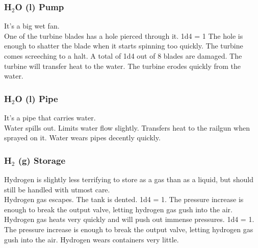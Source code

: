 \documentclass[a4paper]{article}
\begin{document}
\vspace{-0.5cm} \hspace{-18pt} \subsubsection{H$_2$O (l) Pump} \label{life_h2o_pump} \vspace{-0.2cm}
It's a big wet fan.
\\ \pbhw
{One of the turbine blades has a hole pierced through it. \newline 1d4 = 1 The hole is enough to shatter the blade when it starts spinning too quickly. }
{The turbine comes screeching to a halt. A total of 1d4 out of 8 blades are damaged.}
{The turbine will transfer heat to the water. }
{The turbine erodes quickly from the water.}


\vspace{-0.5cm} \hspace{-18pt} \subsubsection{H$_2$O (l) Pipe} \label{life_h2o_pipe} \vspace{-0.2cm}
It's a pipe that carries water.
\\ \pbhw
{Water spills out.}
{Limits water flow slightly.}
{Transfers heat to the railgun when sprayed on it.}
{Water wears pipes decently quickly.}


\vspace{-0.5cm} \hspace{-18pt} \subsubsection{H$_2$ (g) Storage} \label{life_h2_storage} \vspace{-0.2cm}
Hydrogen is slightly less terrifying to store as a gas than as a liquid, but should still be handled with utmost care. 
\\ \pbhw
{Hydrogen gas escapes.}
{The tank is dented. \newline 1d4 = 1. The pressure increase is enough to break the output valve, letting hydrogen gas gush into the air.}
{Hydrogen gas heats very quickly and will push out immense pressures. \newline 1d4 = 1. The pressure increase is enough to break the output valve, letting hydrogen gas gush into the air.}
{Hydrogen wears containers very little.}
\end{document}
